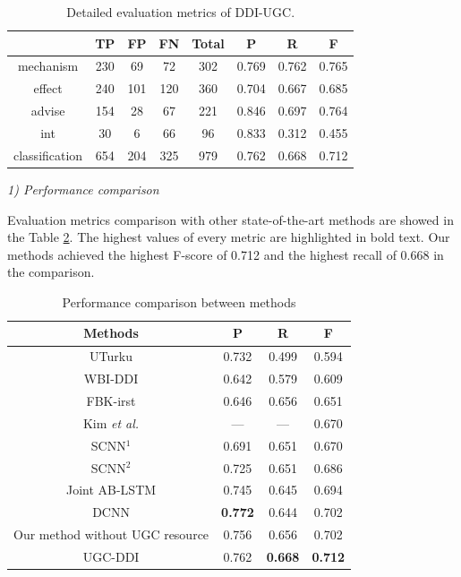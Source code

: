 \documentclass[conference]{IEEEtran}
\begin{document}
\begin{table}
\caption{Detailed evaluation metrics of DDI-UGC.}
\normalsize
\label{table:class_metric}
\begin{center}
\begin{tabular}{cccccccc}
\hline
& TP & FP & FN & Total &P & R & F \\\hline
mechanism &  230 & 69 & 72 & 302 & 0.769 & 0.762 & 0.765\\
effect &  240 & 101 & 120 & 360 & 0.704 & 0.667 & 0.685\\
advise &  154 & 28 & 67 & 221 & 0.846 & 0.697 & 0.764 \\
int &  30 & 6 & 66 & 96 & 0.833 & 0.312 & 0.455\\
classification & 654 & 204 & 325 & 979 & 0.762 & 0.668 & 0.712\\
\hline
\end{tabular}
\end{center}
\end{table}

\bigbreak
\emph{1) Performance comparison}
\bigbreak

Evaluation metrics comparison with other state-of-the-art methods are showed in the Table \ref{table:comp}.
The highest values of every metric are highlighted in bold text.
Our methods achieved the highest F-score of 0.712 and the highest recall of 0.668 in the comparison.

\begin{table}
\caption{Performance comparison between methods}
\normalsize
\label{table:comp}
\centering
\begin{tabular}{cccc}
\hline
 Methods & P & R & F \\ \hline
 UTurku \cite{bjorne_uturku:_2013} & 0.732 &  0.499 &  0.594\\
 WBI-DDI \cite{thomas_wbi-ddi:_2013} & 0.642 &  0.579 &  0.609 \\
 FBK-irst \cite{chowdhury_fbk-irst:_2013} &  0.646 & 0.656 & 0.651\\
 Kim \emph{et al.} \cite{kim_extracting_2015} & --- & --- &  0.670\\
  SCNN$^1$ \cite{zhao_drug_2016} &  0.691 & 0.651 & 0.670\\
 SCNN$^2$ \cite{zhao_drug_2016} &  0.725 & 0.651 & 0.686\\
 Joint AB-LSTM \cite{sahu_drug-drug_2017} &  0.745 & 0.645 & 0.694\\
 DCNN \cite{liu_dependency-based_2016} & \textbf{0.772} & 0.644 & 0.702 \\
 Our method without UGC resource & 0.756 & 0.656 & 0.702 \\
 UGC-DDI & 0.762 & \textbf{0.668} & \textbf{0.712} \\\hline
\end{tabular}
\end{table}
\end{document}
